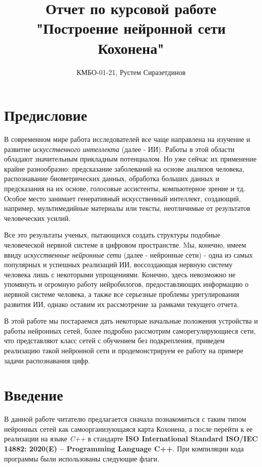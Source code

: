 \documentclass[a4paper,12pt]{report}
\title{Отчет по курсовой работе\\"Построение нейронной сети Кохонена"}
\author{КМБО-01-21, Рустем Сиразетдинов}
\begin{document}
    \maketitle
    \setcounter{page}{2}
    \newpage
    \tableofcontents
    \pagebreak

\chapter{Предисловие}
В современном мире работа исследователей все чаще направлена на
изучение и развитие \textit{искусственного интеллекта} (далее -
ИИ). Работы в этой области обладают значительным
прикладным потенциалом. Но уже сейчас их применение
крайне разнообразно: предсказание заболеваний на основе анализов человека,
распознавание биометрических данных, обработка больших данных и предсказания на их основе, голосовые
ассистенты, компьютерное зрение и тд.
Особое место занимает генеративный искусственный интеллект,
создающий, например, мультимедийные материалы или тексты,
неотличимые от результатов человеческих усилий.

Все это результаты ученых, пытающихся создать структуры подобные человеческой нервной
системе в цифровом пространстве. Mы, конечно, имеем ввиду
\textit{искусственные нейронные сети} (далее - нейронные сети) - одна из самых
популярных и успешных реализаций ИИ, воссоздающая нервную систему
человека лишь с некоторыми упрощениями. Конечно, здесь невозможно не
упомянуть и огромную работу нейробилогов, предоставляющих
информацию о нервной системе человека, а также все серьезные проблемы
урегулирования развития ИИ, однако оставим их рассмотрение за рамками текущего отчета.

В этой работе мы постараемся дать некоторые начальные положения
устройства и работы нейронных сетей, более подробно рассмотрим саморегулирующиеся сети, что представляют класс
сетей с обучением без подкрепления, приведем реализацию такой
нейронной сети и продемонстрируем ее работу на примере задачи
распознавания цифр.

\chapter{Введение} \label{chapter:Introduction}

В данной работе читателю предлагается сначала познакомиться с таким типом нейронных сетей как
самоорганизующаяся карта Кохонена, а после перейти к ее реализации на
языке \textit{C++} в стандарте
\textbf{ISO International Standard ISO/IEC 14882: 2020(E) – Programming
Language C++}. При компиляции кода
программы были использованы следующие флаги.
\end{document}

